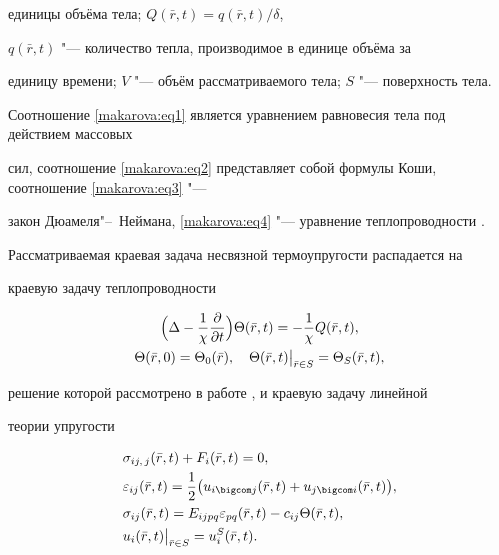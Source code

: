 единицы объёма тела; $Q(\bar {r} , t)={q(\bar{r} , t)}/{\delta}$,

$q(\bar {r} , t)$ "--- количество тепла, производимое в единице объёма за

единицу времени; $V$ "--- объём рассматриваемого тела; $S$ "--- поверхность тела.

Соотношение \eqref{makarova:eq1} является уравнением равновесия тела под действием массовых

сил, соотношение \eqref{makarova:eq2} представляет собой формулы Коши, соотношение \eqref{makarova:eq3} "---

закон Дюамеля"--~Неймана, \eqref{makarova:eq4} "--- уравнение теплопроводности \cite{makarova:bib1}.



Рассматриваемая краевая задача несвязной термоупругости распадается на

краевую задачу теплопроводности

\begin{gather*}

\Bigl(\Delta -\frac{1}{\chi }\frac{\partial }{\partial t}\Bigr)\Theta (\bar {r} , t)=

-\frac{1}{\chi}Q(\bar {r} , t),\\

\Theta (\bar {r} , 0)=\Theta _0 (\bar {r}),\quad 

\Theta (\bar {r} , t)\big|_{\bar {r}\in S} =\Theta _S (\bar {r} , t),

\end{gather*}

решение которой рассмотрено в работе \cite{makarova:bib3}, и краевую задачу линейной

теории упругости

\begin{equation}

\label{makarova:eq5}

\begin{aligned}

&\sigma _{ij,\,j} (\bar {r} , t)+F_i (\bar {r} , t)=0, \\

&\varepsilon _{ij} (\bar {r} , t)=\frac{1}{2}\bigl( u_{i \bigcom j} (\bar

{r} , t)+u_{j \bigcom i} (\bar {r} , t) \bigr), \\

&\sigma _{ij} (\bar {r} , t)=E_{ijpq} \varepsilon _{pq} (\bar

{r} , t)-c_{ij} \Theta (\bar {r} , t), \\

&u_i (\bar {r} , t)\big|_{\bar {r}\in S}=u_i^S (\bar {r} , t).

\end{aligned}

\end{equation}




